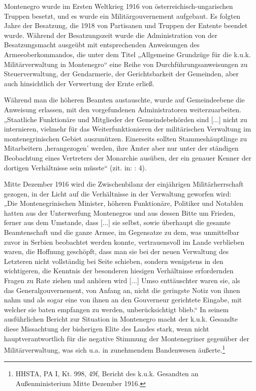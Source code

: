 Montenegro wurde im Ersten Weltkrieg 1916 von österreichisch-ungarischen Truppen besetzt, und es wurde ein Militärgouvernement aufgebaut. Es folgten Jahre der Besatzung, die 1918 von Partisanen und Truppen der Entente beendet wurde. Während der Besatzungszeit wurde die Administration von der Besatzungsmacht ausgeübt mit entsprechenden Anweisungen des Armeeoberkommandos, die unter dem Titel „Allgemeine Grundzüge für die k.u.k. Militärverwaltung in Montenegro“ eine Reihe von Durchführungsanweisungen zu Steuerverwaltung, der Gendarmerie, der Gerichtsbarkeit der Gemeinden, aber auch hinsichtlich der Verwertung der Ernte erließ.\par
Während man die höheren Beamten austauschte, wurde auf Gemeindeebene die Anweisung erlassen, mit den vorgefundenen Administratoren weiterzuarbeiten. „Staatliche Funktionäre und Mitglieder der Gemeindebehörden sind [...] nicht zu internieren, vielmehr für das Weiterfunktionieren der militärischen Verwaltung im montenegrinischen Gebiet auszunützen. Einerseits sollten Stammeshäuptlinge zu Mitarbeitern ‚herangezogen’ werden, ihre Ämter aber nur unter der ständigen Beobachtung eines Vertreters der Monarchie ausüben, der ein genauer Kenner der dortigen Verhältnisse sein müsste“ (zit. in: \cite{scheer}: 4).\par
Mitte Dezember 1916 wird die Zwischenbilanz der einjährigen Militärherrschaft gezogen, in der Licht auf die Verhältnisse in der Verwaltung geworfen wird:\\
„Die Montenegrinischen Minister, höheren Funktionäre, Politiker und Notablen hatten aus der Unterwerfung Montenegros und aus dessen Bitte um Frieden, ferner aus dem Umstande, dass [...] sie selbst, sowie überhaupt die gesamte Beamtenschaft und die ganze Armee, im Gegensatze zu dem, was unmittelbar zuvor in Serbien beobachtet werden konnte, vertrauensvoll im Lande verblieben waren, die Hoffnung geschöpft, dass man sie bei der neuen Verwaltung des Letzteren nicht vollständig bei Seite schieben, sondern wenigstens in den wichtigeren, die Kenntnis der besonderen hiesigen Verhältnisse erfordernden Fragen zu Rate ziehen und anhören wird [...] Umso enttäuschter waren sie, als das Generalgouvernement, von Anfang an, nicht die geringste Notiz von ihnen nahm und als sogar eine von ihnen an den Gouverneur gerichtete Eingabe, mit welcher sie baten empfangen zu werden, unberücksichtigt blieb.“ In seinem ausführlichen Bericht zur Situation in Montenegro macht der k.u.k. Gesandte diese Missachtung der bisherigen Elite des Landes stark, wenn nicht hauptverantwortlich für die negative Stimmung der Montenegriner gegenüber der Militärverwaltung, was sich u.a. in zunehmendem Bandenwesen äußerte.\footnote{HHSTA, PA I, Kt. 998, 49f, Bericht des k.u.k. Gesandten an Außenministerium Mitte Dezember 1916.}\par
